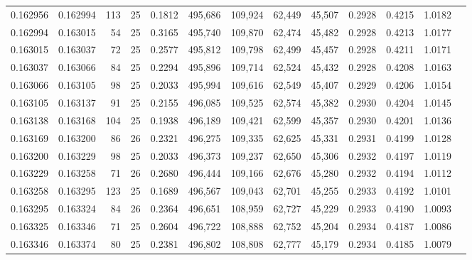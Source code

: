 \begin{tabular}{rrrrrrrrrrrrr}
0.162956 & 0.162994 &   113 &  25 &                                     0.1812 & 495,686 & 109,924 &  62,449 &  45,507 & 0.2928 & 0.4215 & 1.0182 \\
0.162994 & 0.163015 &    54 &  25 &                                     0.3165 & 495,740 & 109,870 &  62,474 &  45,482 & 0.2928 & 0.4213 & 1.0177 \\
0.163015 & 0.163037 &    72 &  25 &                                     0.2577 & 495,812 & 109,798 &  62,499 &  45,457 & 0.2928 & 0.4211 & 1.0171 \\
0.163037 & 0.163066 &    84 &  25 &                                     0.2294 & 495,896 & 109,714 &  62,524 &  45,432 & 0.2928 & 0.4208 & 1.0163 \\
0.163066 & 0.163105 &    98 &  25 &                                     0.2033 & 495,994 & 109,616 &  62,549 &  45,407 & 0.2929 & 0.4206 & 1.0154 \\
0.163105 & 0.163137 &    91 &  25 &                                     0.2155 & 496,085 & 109,525 &  62,574 &  45,382 & 0.2930 & 0.4204 & 1.0145 \\
0.163138 & 0.163168 &   104 &  25 &                                     0.1938 & 496,189 & 109,421 &  62,599 &  45,357 & 0.2930 & 0.4201 & 1.0136 \\
0.163169 & 0.163200 &    86 &  26 &                                     0.2321 & 496,275 & 109,335 &  62,625 &  45,331 & 0.2931 & 0.4199 & 1.0128 \\
0.163200 & 0.163229 &    98 &  25 &                                     0.2033 & 496,373 & 109,237 &  62,650 &  45,306 & 0.2932 & 0.4197 & 1.0119 \\
0.163229 & 0.163258 &    71 &  26 &                                     0.2680 & 496,444 & 109,166 &  62,676 &  45,280 & 0.2932 & 0.4194 & 1.0112 \\
0.163258 & 0.163295 &   123 &  25 &                                     0.1689 & 496,567 & 109,043 &  62,701 &  45,255 & 0.2933 & 0.4192 & 1.0101 \\
0.163295 & 0.163324 &    84 &  26 &                                     0.2364 & 496,651 & 108,959 &  62,727 &  45,229 & 0.2933 & 0.4190 & 1.0093 \\
0.163325 & 0.163346 &    71 &  25 &                                     0.2604 & 496,722 & 108,888 &  62,752 &  45,204 & 0.2934 & 0.4187 & 1.0086 \\
0.163346 & 0.163374 &    80 &  25 &                                     0.2381 & 496,802 & 108,808 &  62,777 &  45,179 & 0.2934 & 0.4185 & 1.0079 \\

\end{tabular}
